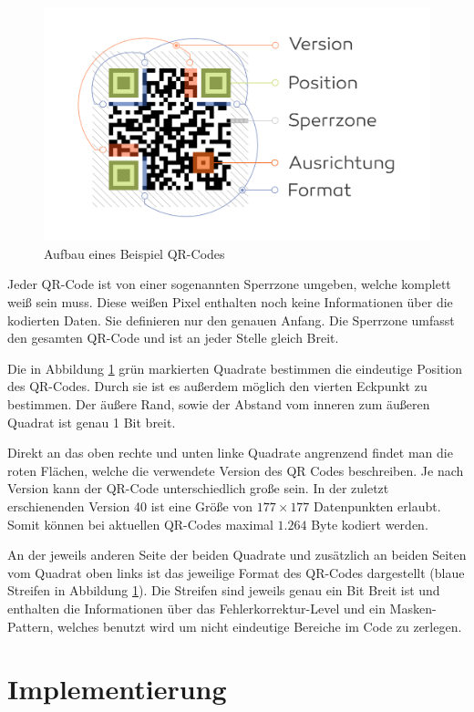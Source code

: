 \documentclass[a4paper, oneside, 12pt]{article}
\begin{document}
	\begin{figure}[h]
		\includegraphics[width=\textwidth]{images/aufbau.png}
		\caption{Aufbau eines Beispiel QR-Codes}
		\label{fig:aufbau}
	\end{figure}
	
	Jeder QR-Code ist von einer sogenannten Sperrzone umgeben, welche komplett weiß sein muss. Diese weißen Pixel enthalten noch keine Informationen über die kodierten Daten. Sie definieren nur den genauen Anfang. Die Sperrzone umfasst den gesamten QR-Code und ist an jeder Stelle gleich Breit.
	
	Die in Abbildung \ref{fig:aufbau} grün markierten Quadrate bestimmen die eindeutige Position des QR-Codes. Durch sie ist es außerdem möglich den vierten Eckpunkt zu bestimmen. Der äußere Rand, sowie der Abstand vom inneren zum äußeren Quadrat ist genau 1 Bit breit.
	
	Direkt an das oben rechte und unten linke Quadrate angrenzend findet man die roten Flächen, welche die verwendete Version des QR Codes beschreiben. Je nach Version kann der QR-Code unterschiedlich große sein. In der zuletzt erschienenden Version 40 ist eine Größe von $177 \times 177$ Datenpunkten erlaubt. Somit können bei aktuellen QR-Codes maximal $1.264$ Byte kodiert werden.
	
	An der jeweils anderen Seite der beiden Quadrate und zusätzlich an beiden Seiten vom Quadrat oben links ist das jeweilige Format des QR-Codes dargestellt (blaue Streifen in Abbildung \ref{fig:aufbau}). Die Streifen sind jeweils genau ein Bit Breit ist und enthalten die Informationen über das Fehlerkorrektur-Level und ein Masken-Pattern, welches benutzt wird um nicht eindeutige Bereiche im Code zu zerlegen.
	
	
	
	\newpage
	\section{Implementierung}
	
\end{document}
